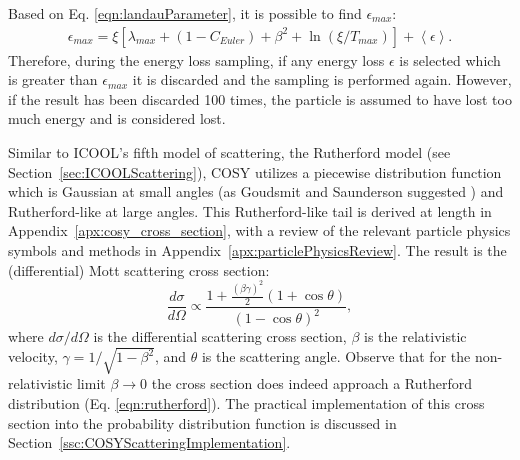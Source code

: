 Based on Eq. \eqref{eqn:landauParameter}, it is possible to find $\epsilon_{max}$:
\begin{align*}
\epsilon_{max}=\xi[\lambda_{max}+(1-C_{Euler})+\beta^2+\ln(\xi/T_{max})]+\left<\epsilon\right>.
\end{align*}
Therefore, during the energy loss sampling, if any energy loss $\epsilon$ is selected which is greater than $\epsilon_{max}$ it is discarded and the sampling is performed again. However, if the result has been discarded 100 times, the particle is assumed to have lost too much energy and is considered lost.

%
%
 \label{sec:COSYScattering}\par
Similar to ICOOL's fifth model of scattering, the Rutherford model (see Section~\ref{sec:ICOOLScattering}), COSY utilizes a piecewise distribution function which is Gaussian  at small angles (as Goudsmit and Saunderson suggested \cite{gs}) and Rutherford-like at large angles. This Rutherford-like tail is derived at length in Appendix~\ref{apx:cosy_cross_section}, with a review of the relevant particle physics symbols and methods in Appendix~\ref{apx:particlePhysicsReview}. The result is the (differential) Mott scattering cross section:
\begin{equation}\label{eqn:MottCrossSection}
\frac{d\sigma}{d\Omega} \propto \frac{1+\frac{(\beta\gamma)^2}{2} (1+\cos\theta)  }{(1-\cos\theta)^2},
\end{equation}
where $d\sigma/d\Omega$ is the differential scattering cross section, $\beta$ is the relativistic velocity, $\gamma=1/\sqrt{1-\beta^2}$, and $\theta$ is the scattering angle. Observe that for the non-relativistic limit $\beta\rightarrow 0$ the cross section does indeed approach a Rutherford distribution (Eq. \eqref{eqn:rutherford}). The practical implementation of this cross section into the probability distribution function is discussed in Section~\ref{ssc:COSYScatteringImplementation}.

